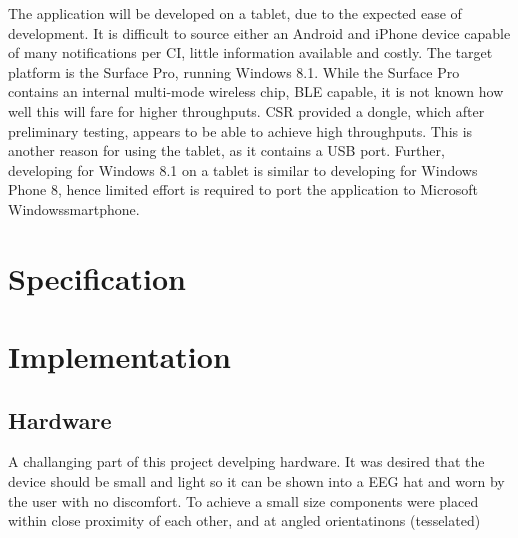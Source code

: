 \documentclass[]{article}
\begin{document}
The application will be developed on a tablet, due to the expected ease of development. It is difficult to source either an Android and iPhone device capable of many notifications per \ac{CI}, little information available and costly. The target platform is the Surface Pro, running Windows 8.1. While the Surface Pro contains an internal multi-mode wireless chip, \ac{BLE} capable, it is not known how well this will fare for higher throughputs. \ac{CSR} provided a dongle, which after preliminary testing, appears to be able to achieve high throughputs. This is another reason for using the tablet, as it contains a \ac{USB} port. Further, developing for Windows 8.1 on a tablet is similar to developing for Windows Phone 8, hence limited effort is required to port the application to Microsoft Windows\textregistered smartphone.


\clearpage
\section{Specification}
\clearpage
\section{Implementation}

\subsection{Hardware}

A challanging part of this project develping hardware. It was desired that the device should be small and light so it can be shown into a \ac{EEG} hat and worn by the user with no discomfort. To achieve a small size components were placed within close proximity of each other, and at angled orientatinons (tesselated)
\end{document}
